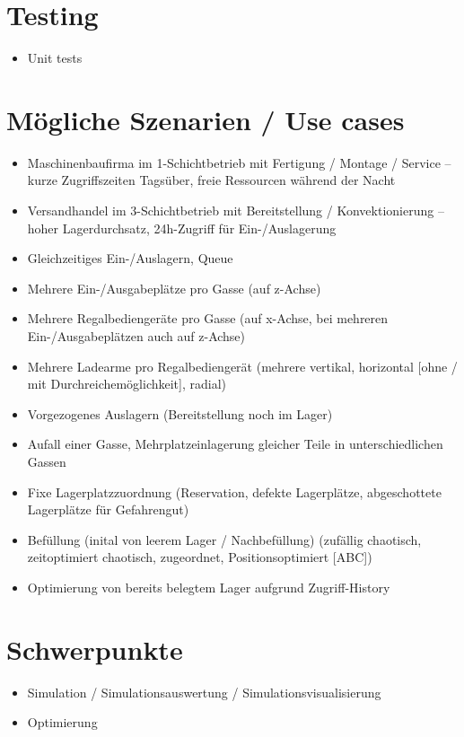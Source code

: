 \documentclass[11pt,a4paper]{article}
\begin{document}
\section{Testing}
\begin{itemize}
  \item Unit tests
\end{itemize}
%
\section{Mögliche Szenarien / Use cases}
%
\begin{itemize}
  \item Maschinenbaufirma im 1-Schichtbetrieb mit Fertigung / Montage / Service -- kurze Zugriffszeiten Tagsüber, freie Ressourcen während der Nacht
  \item Versandhandel im 3-Schichtbetrieb mit Bereitstellung / Konvektionierung --  hoher Lagerdurchsatz, 24h-Zugriff für Ein-/Auslagerung
  \item Gleichzeitiges Ein-/Auslagern, Queue
  \item Mehrere Ein-/Ausgabeplätze pro Gasse (auf z-Achse)
  \item Mehrere Regalbediengeräte pro Gasse (auf x-Achse, bei mehreren Ein-/Ausgabeplätzen auch auf z-Achse)
  \item Mehrere Ladearme pro Regalbediengerät (mehrere vertikal, horizontal [ohne / mit Durchreichemöglichkeit], radial)
  \item Vorgezogenes Auslagern (Bereitstellung noch im Lager)
  \item Aufall einer Gasse, Mehrplatzeinlagerung gleicher Teile in unterschiedlichen Gassen
  \item Fixe Lagerplatzzuordnung (Reservation, defekte Lagerplätze, abgeschottete Lagerplätze für Gefahrengut)
  \item Befüllung (inital von leerem Lager / Nachbefüllung) (zufällig chaotisch, zeitoptimiert chaotisch, zugeordnet, Positionsoptimiert [ABC])
  \item Optimierung von bereits belegtem Lager aufgrund Zugriff-History
\end{itemize}
%
\section{Schwerpunkte}
\begin{itemize}
  \item Simulation / Simulationsauswertung / Simulationsvisualisierung
  \item Optimierung
\end{itemize}
%
\end{document}
